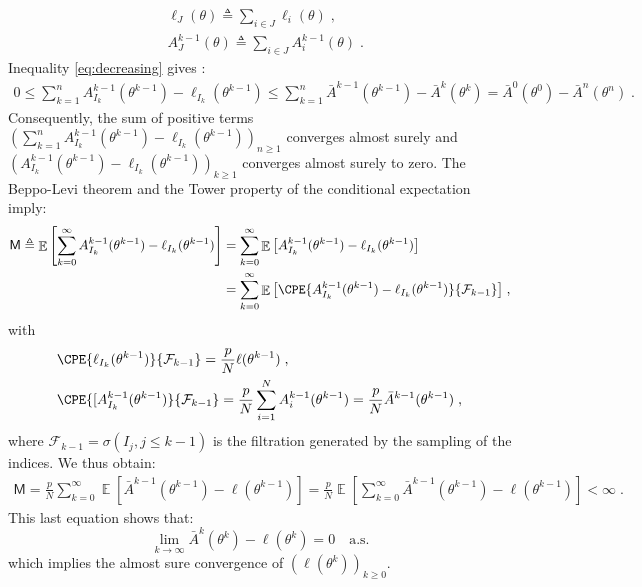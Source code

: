 \documentclass[11pt]{article}
\theoremstyle{plain}
\def\eqs{\;}
\newcommand{\loglike}{\ell}
\DeclareMathOperator*{\E}{\mathbb{E}}
\theoremstyle{plain}
\theoremstyle{definition}
\begin{document}
\begin{align}\label{batchnotation}
& \loglike_{J}(\theta) \triangleq \sum_{i \in J}^{}{\loglike_{i}(\theta)}\eqs,\\
& A^{k-1}_{J}(\theta) \triangleq \sum_{i \in J}^{}{A^{k-1}_{i}(\theta)}\eqs.
\end{align}
Inequality \eqref{eq:decreasing} gives :
\begin{align}
0 \leq \sum_{k=1}^{n}{A^{k-1}_{I_{k}}(\theta^{k-1}) - \loglike_{I_{k}}(\theta^{k-1})} \leq \sum_{k=1}^{n}{ \bar{A}^{k-1}(\theta^{k-1}) - \bar{A}^k(\theta^{k})} =  \bar{A}^{0}(\theta^{0}) - \bar{A}^n(\theta^{n})\eqs.
\end{align}
Consequently, the sum of positive terms $\left(\sum_{k=1}^{n}{A^{k-1}_{I_{k}}(\theta^{k-1}) - \loglike_{I_{k}}(\theta^{k-1})} \right)_{n \geq 1}$ converges almost surely and $\left(A^{k-1}_{I_{k}}(\theta^{k-1}) - \loglike_{I_{k}}(\theta^{k-1})\right)_{k\geq1}$ converges almost surely to zero.
The Beppo-Levi theorem and the Tower property of the conditional expectation imply:
\begin{align}\label{Mdeter1}
\mathsf{M} \triangleq \E \left[\sum_{k=0}^{\infty}{A^{k-1}_{I_{k}}(\theta^{k-1}) - \loglike_{I_{k}}(\theta^{k-1})}\right] & = \sum_{k=0}^{\infty}{\E \left[A^{k-1}_{I_{k}}(\theta^{k-1}) - \loglike_{I_{k}}(\theta^{k-1})\right]} \\
& = \sum_{k=0}^{\infty}{\E \left[\CPE{A^{k-1}_{I_{k}}(\theta^{k-1}) - \loglike_{I_{k}}(\theta^{k-1})}{\mathcal{F}_{k-1}} \right]}\eqs,
\end{align}
with 
\begin{align*}
& \CPE{\loglike_{I_{k}}(\theta^{k-1})}{\mathcal{F}_{k-1}} = \frac{p}{N} \loglike(\theta^{k-1}) \eqs,\\
& \CPE{[A^{k-1}_{I_{k}}(\theta^{k-1})}{\mathcal{F}_{k-1}} = \frac{p}{N} \sum_{i=1}^{N}{A^{k-1}_{i}(\theta^{k-1})} = \frac{p}{N}\bar{A}^{k-1}(\theta^{k-1}) \eqs,
\end{align*}
where $\mathcal{F}_{k-1} = \sigma(I_j, j \leq k-1)$ is the filtration generated by the sampling of the indices.
We thus obtain:
\begin{align}\label{Mdeter2}
\mathsf{M} =\frac{p}{N} \sum_{k=0}^{\infty}{\E \left[\bar{A}^{k-1}(\theta^{k-1}) - \loglike(\theta^{k-1})\right]} = \frac{p}{N} \E \left[\sum_{k=0}^{\infty}{\bar{A}^{k-1}(\theta^{k-1}) - \loglike(\theta^{k-1})}\right] < \infty \eqs.
\end{align}
This last equation shows that:
\begin{equation}\label{detergap}
    \lim \limits_{k \to \infty} \bar{A}^{k}(\theta^{k}) - \loglike(\theta^{k}) = 0 \quad \textrm{a.s.}
\end{equation}
which implies the almost sure convergence of $\left(\loglike(\theta^{k})\right)_{k\geq0}$.
\end{document}
